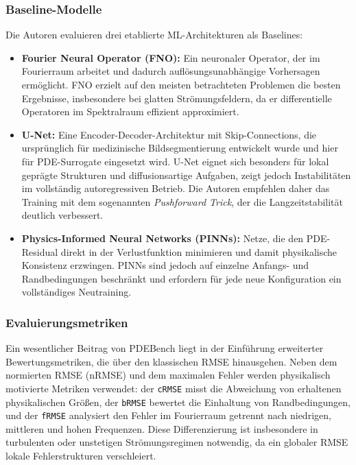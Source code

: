 \documentclass[a4paper,12pt]{article}
\begin{document}
\subsubsection*{Baseline-Modelle}

Die Autoren evaluieren drei etablierte ML-Architekturen als Baselines:
\begin{itemize}
    \item \textbf{Fourier Neural Operator (FNO):} Ein neuronaler Operator, der im
    Fourierraum arbeitet und dadurch auflösungsunabhängige Vorhersagen ermöglicht.
    FNO erzielt auf den meisten betrachteten Problemen die besten Ergebnisse, insbesondere
    bei glatten Strömungsfeldern, da er differentielle Operatoren im Spektralraum effizient
    approximiert.
    \item \textbf{U-Net:} Eine Encoder-Decoder-Architektur mit Skip-Connections, die
    ursprünglich für medizinische Bildsegmentierung entwickelt wurde und hier für
    PDE-Surrogate eingesetzt wird. U-Net eignet sich besonders für lokal geprägte
    Strukturen und diffusionsartige Aufgaben, zeigt jedoch Instabilitäten im vollständig
    autoregressiven Betrieb. Die Autoren empfehlen daher das Training mit dem sogenannten
    \emph{Pushforward Trick}, der die Langzeitstabilität deutlich verbessert.
    \item \textbf{Physics-Informed Neural Networks (PINNs):} Netze, die den PDE-Residual
    direkt in der Verlustfunktion minimieren und damit physikalische Konsistenz erzwingen.
    PINNs sind jedoch auf einzelne Anfangs- und Randbedingungen beschränkt und erfordern
    für jede neue Konfiguration ein vollständiges Neutraining.
\end{itemize}

\subsubsection*{Evaluierungsmetriken}

Ein wesentlicher Beitrag von PDEBench liegt in der Einführung erweiterter Bewertungsmetriken,
die über den klassischen RMSE hinausgehen. Neben dem normierten RMSE (nRMSE) und dem
maximalen Fehler werden physikalisch motivierte Metriken verwendet: der \texttt{cRMSE}
misst die Abweichung von erhaltenen physikalischen Größen, der \texttt{bRMSE} bewertet
die Einhaltung von Randbedingungen, und der \texttt{fRMSE} analysiert den Fehler im
Fourierraum getrennt nach niedrigen, mittleren und hohen Frequenzen. Diese Differenzierung
ist insbesondere in turbulenten oder unstetigen Strömungsregimen notwendig, da ein globaler
RMSE lokale Fehlerstrukturen verschleiert.
\end{document}
